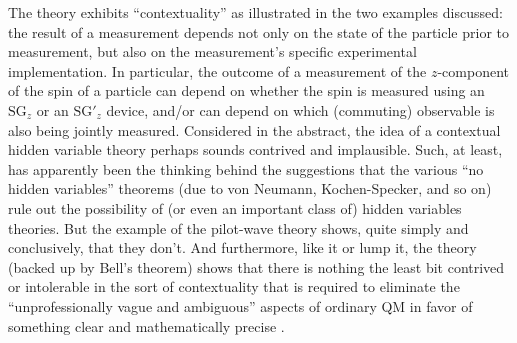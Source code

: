 \documentclass[aps,prc,onecolumn,letterpaper,floatfix,12pt]{revtex4}
\begin{document}
The theory exhibits ``contextuality'' as illustrated in the two
examples discussed:  the result of a measurement  
depends not only on the state of the
particle prior to measurement, but also on the measurement's specific experimental
implementation.  In particular, the outcome of a
measurement of the $z$-component of the spin of a particle can depend
on whether the spin is measured using an $\text{SG}_z$ or an
$\text{SG}'_z$ device, and/or can depend on which (commuting)
observable
is also being jointly measured.  
Considered in the abstract, the idea of a contextual hidden variable
theory perhaps sounds contrived and implausible.  Such, at least, has
apparently been the thinking behind the suggestions that the various
``no hidden variables'' theorems (due to von Neumann, Kochen-Specker,
and so on) rule out the possibility of (or even an important class of)
hidden variables theories.  But the example of the pilot-wave theory shows,
quite simply and conclusively, that they don't.  And
furthermore, like it or lump it,
the theory (backed up by Bell's theorem) 
shows that there is nothing the least bit contrived or
intolerable in the sort of contextuality that is required to eliminate
the ``unprofessionally vague and ambiguous'' aspects of ordinary QM in
favor of something clear and mathematically precise \cite{vague}.  
\end{document}
